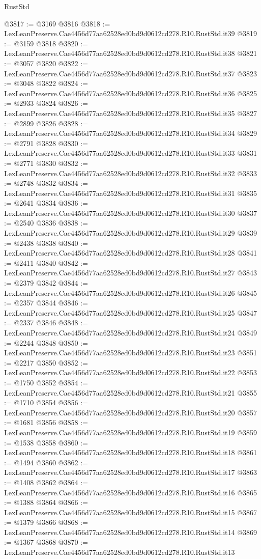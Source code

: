 \begin{lexlean}{RustStd}
\begin{coremodule}
@3817 := @3169 @3816
@3818 := LexLeanPreserve.Cae4456d77aa62528ed0bd9d0612cd278.R10.RustStd.it39
@3819 := @3159 @3818
@3820 := LexLeanPreserve.Cae4456d77aa62528ed0bd9d0612cd278.R10.RustStd.it38
@3821 := @3057 @3820
@3822 := LexLeanPreserve.Cae4456d77aa62528ed0bd9d0612cd278.R10.RustStd.it37
@3823 := @3048 @3822
@3824 := LexLeanPreserve.Cae4456d77aa62528ed0bd9d0612cd278.R10.RustStd.it36
@3825 := @2933 @3824
@3826 := LexLeanPreserve.Cae4456d77aa62528ed0bd9d0612cd278.R10.RustStd.it35
@3827 := @2899 @3826
@3828 := LexLeanPreserve.Cae4456d77aa62528ed0bd9d0612cd278.R10.RustStd.it34
@3829 := @2791 @3828
@3830 := LexLeanPreserve.Cae4456d77aa62528ed0bd9d0612cd278.R10.RustStd.it33
@3831 := @2771 @3830
@3832 := LexLeanPreserve.Cae4456d77aa62528ed0bd9d0612cd278.R10.RustStd.it32
@3833 := @2748 @3832
@3834 := LexLeanPreserve.Cae4456d77aa62528ed0bd9d0612cd278.R10.RustStd.it31
@3835 := @2641 @3834
@3836 := LexLeanPreserve.Cae4456d77aa62528ed0bd9d0612cd278.R10.RustStd.it30
@3837 := @2540 @3836
@3838 := LexLeanPreserve.Cae4456d77aa62528ed0bd9d0612cd278.R10.RustStd.it29
@3839 := @2438 @3838
@3840 := LexLeanPreserve.Cae4456d77aa62528ed0bd9d0612cd278.R10.RustStd.it28
@3841 := @2411 @3840
@3842 := LexLeanPreserve.Cae4456d77aa62528ed0bd9d0612cd278.R10.RustStd.it27
@3843 := @2379 @3842
@3844 := LexLeanPreserve.Cae4456d77aa62528ed0bd9d0612cd278.R10.RustStd.it26
@3845 := @2357 @3844
@3846 := LexLeanPreserve.Cae4456d77aa62528ed0bd9d0612cd278.R10.RustStd.it25
@3847 := @2337 @3846
@3848 := LexLeanPreserve.Cae4456d77aa62528ed0bd9d0612cd278.R10.RustStd.it24
@3849 := @2244 @3848
@3850 := LexLeanPreserve.Cae4456d77aa62528ed0bd9d0612cd278.R10.RustStd.it23
@3851 := @2217 @3850
@3852 := LexLeanPreserve.Cae4456d77aa62528ed0bd9d0612cd278.R10.RustStd.it22
@3853 := @1750 @3852
@3854 := LexLeanPreserve.Cae4456d77aa62528ed0bd9d0612cd278.R10.RustStd.it21
@3855 := @1710 @3854
@3856 := LexLeanPreserve.Cae4456d77aa62528ed0bd9d0612cd278.R10.RustStd.it20
@3857 := @1681 @3856
@3858 := LexLeanPreserve.Cae4456d77aa62528ed0bd9d0612cd278.R10.RustStd.it19
@3859 := @1538 @3858
@3860 := LexLeanPreserve.Cae4456d77aa62528ed0bd9d0612cd278.R10.RustStd.it18
@3861 := @1494 @3860
@3862 := LexLeanPreserve.Cae4456d77aa62528ed0bd9d0612cd278.R10.RustStd.it17
@3863 := @1408 @3862
@3864 := LexLeanPreserve.Cae4456d77aa62528ed0bd9d0612cd278.R10.RustStd.it16
@3865 := @1388 @3864
@3866 := LexLeanPreserve.Cae4456d77aa62528ed0bd9d0612cd278.R10.RustStd.it15
@3867 := @1379 @3866
@3868 := LexLeanPreserve.Cae4456d77aa62528ed0bd9d0612cd278.R10.RustStd.it14
@3869 := @1367 @3868
@3870 := LexLeanPreserve.Cae4456d77aa62528ed0bd9d0612cd278.R10.RustStd.it13

\end{coremodule}
\end{lexlean}
